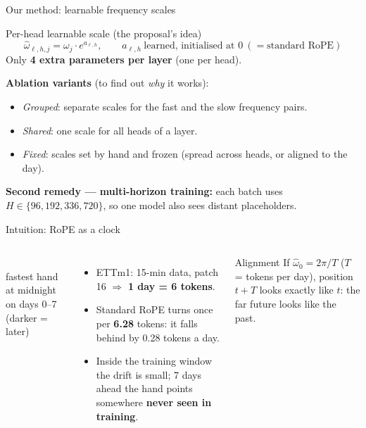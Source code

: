 \documentclass[aspectratio=169,xcolor=dvipsnames]{beamer}
\begin{document}
\begin{frame}{Our method: learnable frequency scales}
\begin{block}{Per-head learnable scale (the proposal's idea)}
\[
\hat\omega_{\ell,h,j}=\omega_j\cdot e^{a_{\ell,h}},\qquad a_{\ell,h}\ \text{learned, initialised at }0\ (=\text{standard RoPE})
\]
Only \textbf{4 extra parameters per layer} (one per head).
\end{block}
\textbf{Ablation variants} (to find out \emph{why} it works):
\begin{itemize}
\item \emph{Grouped}: separate scales for the fast and the slow frequency pairs.
\item \emph{Shared}: one scale for all heads of a layer.
\item \emph{Fixed}: scales set by hand and frozen (spread across heads, or aligned to the day).
\end{itemize}
\textbf{Second remedy --- multi-horizon training:} each batch uses $H\in\{96,192,336,720\}$, so one model also sees distant placeholders.
\end{frame}

\begin{frame}{Intuition: RoPE as a clock}
\begin{columns}[c]
\centering
{}
\\[2pt]{\scriptsize fastest hand at midnight on days 0--7 (darker = later)}
\begin{itemize}
\item ETTm1: 15-min data, patch 16 $\Rightarrow$ \textbf{1 day = 6 tokens}.
\item Standard RoPE turns once per \textbf{6.28} tokens: it falls behind by 0.28 tokens a day.
\item Inside the training window the drift is small; 7 days ahead the hand points somewhere \textbf{never seen in training}.
\end{itemize}
\begin{block}{Alignment}
If $\hat\omega_0=2\pi/T$ ($T$ = tokens per day), position $t+T$ looks exactly like $t$: the far future looks like the past.
\end{block}
\end{columns}
\end{frame}
\end{document}
